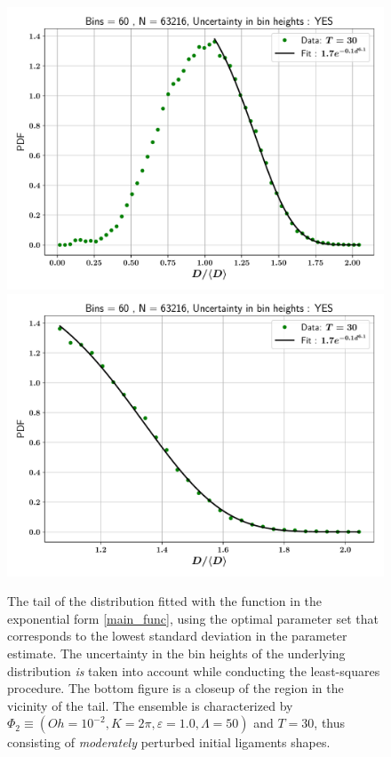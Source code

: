 
\begin{figure}
\centering
\includegraphics{plots/drop_stats/linear_tail_fit_uncertainty_yes.pdf} \\
\includegraphics{plots/drop_stats/linear_zoom_tail_fit_uncertainty_yes.pdf} \\ 
\caption{
	The tail of the distribution fitted with the function 
	in the exponential form \eqref{main_func}, using the optimal parameter
	set that corresponds to the lowest standard deviation in the parameter estimate.
	The uncertainty in the bin heights of the underlying distribution \textit{is} 
	taken into account while conducting the least-squares procedure. 
	The bottom figure is a closeup of the region in the vicinity of the tail.
	The ensemble is characterized by $\Phi_2 \equiv \left( Oh = 10^{-2}, K = 2\pi 
	, \varepsilon = 1.0 , \Lambda = 50 \right)$ and $T = 30$, 
	thus consisting of \textit{moderately} perturbed initial ligaments shapes. 
	}
\label{linear_fits_with}
\end{figure}


